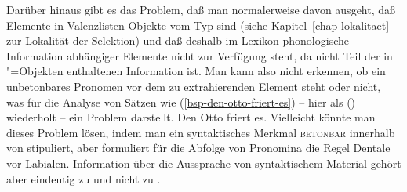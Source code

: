 Darüber hinaus gibt es das Problem, daß man normalerweise davon ausgeht, daß Elemente in Valenzlisten
Objekte vom Typ  sind (siehe Kapitel~\ref{chap-lokalitaet} zur Lokalität der Selektion)
und daß deshalb im Lexikon phonologische Information abhängiger Elemente nicht zur Verfügung steht,
da \phon nicht Teil der in "=Objekten enthaltenen Information ist. Man kann also nicht
erkennen, ob ein unbetonbares Pronomen vor dem zu extrahierenden Element steht oder nicht, was für
die Analyse von Sätzen wie (\ref{bsp-den-otto-friert-es}) -- hier als () wiederholt -- ein
Problem darstellt. 
\ea
\label{bsp-den-otto-friert-es-zwei}
Den Otto friert es.
\z
Vielleicht könnte man dieses Problem lösen, indem man ein syntaktisches Merkmal \textsc{betonbar}
innerhalb von \synsem stipuliert, aber \citet[]{Abraham95a-u} formuliert für die Abfolge
von Pronomina die Regel Dentale vor Labialen. Information über die Aussprache von syntaktischem
Material gehört aber eindeutig zu \phon und nicht zu \synsem.
%
%
%
%



